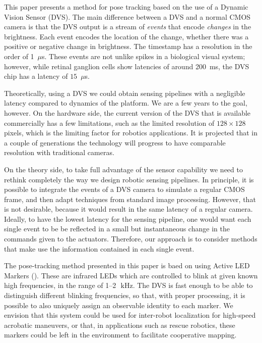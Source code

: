 This paper presents a method for pose tracking based on the use of
a Dynamic Vision Sensor (DVS). The main difference between a DVS and
a normal CMOS camera is that the DVS output is a stream of \emph{events}
that encode \emph{changes} in the brightness. Each event encodes
the location of the change, whether there was a positive or negative
change in brightness. The timestamp has a resolution in the order
of 1~$\mu$s.  These events are not unlike spikes in a biological
visual system; however, while retinal ganglion cells show latencies
of around 200~ms, the DVS chip has a latency of $15$~$\mu$s.

Theoretically, using a DVS we could obtain sensing pipelines with
a negligible latency compared to dynamics of the platform. We are
a few years to the goal, however. On the hardware side, the current
version of the DVS that is available commercially has a few limitations,
such as the limited resolution of $128\times128$ pixels, which is
the limiting factor for robotics applications.  It is projected
that in a couple of generations the technology will progress to have
comparable resolution with traditional cameras.

On the theory side, to take full advantage of the sensor capability
we need to rethink completely the way we design robotic sensing pipelines.
In principle, it is possible to integrate the events of a DVS camera
to simulate a regular CMOS frame, and then adapt techniques from standard
image processing. However, that is not desirable, because it would
result in the same latency of a regular camera. Ideally, to have the
lowest latency for the sensing pipeline, one would want each single
event to be be reflected in a small but instantaneous change in the
commands given to the actuators. Therefore, our approach is to consider
methods that make use the information contained in each single event.

The pose-tracking method presented in this paper is baed on using
Active LED Markers (\ALMs). These are infrared LEDs which are controlled
to blink at given known high frequencies, in the range of 1--2~$\,\mbox{kHz}$.
The DVS is fast enough to be able to distinguish different blinking
frequencies, so that, with proper processing, it is possible to also
uniquely assign an observable identity to each marker. We envision
that this system could be used for inter-robot localization for high-speed
acrobatic maneuvers, or that, in applications such as rescue robotics,
these markers could be left in the environment to facilitate cooperative
mapping.

